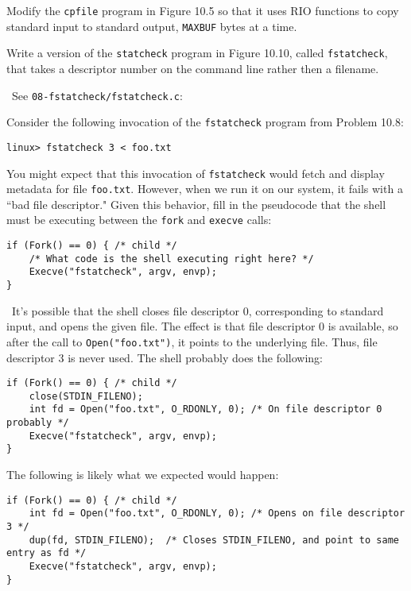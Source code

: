 \documentclass[12pt]{article}
\newenvironment{ex}[2][Exercise]{\begin{trivlist}
		\item[\hskip \labelsep {\bfseries #1}\hskip \labelsep {\bfseries #2.}]}{\end{trivlist}}
\newenvironment{sol}[1][Solution]{\begin{trivlist}
		\item[\hskip \labelsep {\bfseries #1:}]}{\end{trivlist}}
\begin{document}
\begin{ex}{10.7}
	Modify the \texttt{cpfile} program in Figure 10.5 so that it uses RIO functions to copy
	standard input to standard output, \texttt{MAXBUF} bytes at a time.
\end{ex}

\begin{ex}{10.8}
	Write a version of the \texttt{statcheck} program in Figure 10.10, called \texttt{fstatcheck},
	that takes a descriptor number on the command line rather then a filename.
\end{ex}

\begin{sol}
	\
	See \texttt{08-fstatcheck/fstatcheck.c}:
	
\end{sol}

\begin{ex}{10.9}
	Consider the following invocation of the \texttt{fstatcheck} program from Problem 10.8:
	\begin{lstlisting}[language={}]
linux> fstatcheck 3 < foo.txt
	\end{lstlisting}
	You might expect that this invocation of \texttt{fstatcheck} would fetch and display metadata
	for file \texttt{foo.txt}. However, when we run it on our system, it fails with a ``bad file
	descriptor." Given this behavior, fill in the pseudocode that the shell must be executing between
	the \texttt{fork} and \texttt{execve} calls:
	\begin{lstlisting}
if (Fork() == 0) { /* child */
	/* What code is the shell executing right here? */
	Execve("fstatcheck", argv, envp);
}
	\end{lstlisting}
\end{ex}

\begin{sol}
	\
	It's possible that the shell closes file descriptor 0, corresponding to standard input,
	and opens the given file. The effect is that file descriptor 0 is available, so after
	the call to \texttt{Open("foo.txt")}, it points to the underlying file. Thus, file descriptor
	3 is never used. The shell probably does the following:
	\begin{lstlisting}
if (Fork() == 0) { /* child */
	close(STDIN_FILENO);
	int fd = Open("foo.txt", O_RDONLY, 0); /* On file descriptor 0 probably */
	Execve("fstatcheck", argv, envp);
}
	\end{lstlisting}
	The following is likely what we expected would happen:
	\begin{lstlisting}
if (Fork() == 0) { /* child */
	int fd = Open("foo.txt", O_RDONLY, 0); /* Opens on file descriptor 3 */
	dup(fd, STDIN_FILENO);	/* Closes STDIN_FILENO, and point to same entry as fd */
	Execve("fstatcheck", argv, envp);
}
	\end{lstlisting}
\end{sol}
\end{document}
